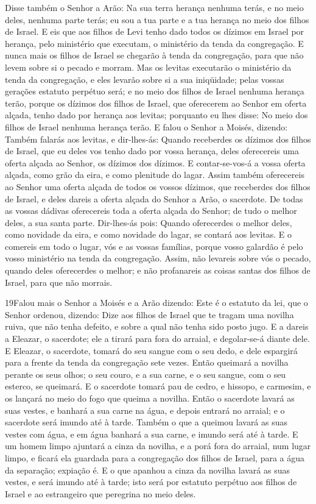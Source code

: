 Disse também o Senhor a Arão: Na sua terra herança nenhuma terás,
e no meio deles, nenhuma parte terás; eu sou a tua parte e a tua
herança no meio dos filhos de Israel. E eis que aos filhos de
Levi tenho dado todos os dízimos em Israel por herança, pelo
ministério que executam, o ministério da tenda da congregação.
E nunca mais os filhos de Israel se chegarão à tenda da
congregação, para que não levem sobre si o pecado e morram.
Mas os levitas executarão o ministério da tenda da
congregação, e eles levarão sobre si a sua iniqüidade; pelas vossas
gerações estatuto perpétuo será; e no meio dos filhos de Israel
nenhuma herança terão, porque os dízimos dos filhos de
Israel, que oferecerem ao Senhor em oferta alçada, tenho dado por
herança aos levitas; porquanto eu lhes disse: No meio dos filhos de
Israel nenhuma herança terão. E falou o Senhor a Moisés,
dizendo: Também falarás aos levitas, e dir-lhes-ás: Quando
receberdes os dízimos dos filhos de Israel, que eu deles vos tenho
dado por vossa herança, deles oferecereis uma oferta alçada ao
Senhor, os dízimos dos dízimos. E contar-se-vos-á a vossa
oferta alçada, como grão da eira, e como plenitude do lagar.
Assim também oferecereis ao Senhor uma oferta alçada de todos
os vossos dízimos, que receberdes dos filhos de Israel, e deles
dareis a oferta alçada do Senhor a Arão, o sacerdote. De
todas as vossas dádivas oferecereis toda a oferta alçada do Senhor;
de tudo o melhor deles, a sua santa parte. Dir-lhes-ás pois:
Quando oferecerdes o melhor deles, como novidade da eira, e como
novidade do lagar, se contará aos levitas. E o comereis em
todo o lugar, vós e as vossas famílias, porque vosso galardão é pelo
vosso ministério na tenda da congregação. Assim, não levareis
sobre vós o pecado, quando deles oferecerdes o melhor; e não
profanareis as coisas santas dos filhos de Israel, para que não
morrais.

\medskip

\lettrine{19} Falou mais o Senhor a Moisés e a Arão dizendo:
Este é o estatuto da lei, que o Senhor ordenou, dizendo: Dize
aos filhos de Israel que te tragam uma novilha ruiva, que não tenha
defeito, e sobre a qual não tenha sido posto jugo. E a dareis a
Eleazar, o sacerdote; ele a tirará para fora do arraial, e
degolar-se-á diante dele. E Eleazar, o sacerdote, tomará do seu
sangue com o seu dedo, e dele espargirá para a frente da tenda da
congregação sete vezes. Então queimará a novilha perante os seus
olhos; o seu couro, e a sua carne, e o seu sangue, com o seu
esterco, se queimará. E o sacerdote tomará pau de cedro, e
hissopo, e carmesim, e os lançará no meio do fogo que queima a
novilha. Então o sacerdote lavará as suas vestes, e banhará a
sua carne na água, e depois entrará no arraial; e o sacerdote será
imundo até à tarde. Também o que a queimou lavará as suas vestes
com água, e em água banhará a sua carne, e imundo será até à tarde.
E um homem limpo ajuntará a cinza da novilha, e a porá fora do
arraial, num lugar limpo, e ficará ela guardada para a congregação
dos filhos de Israel, para a água da separação; expiação é. E
o que apanhou a cinza da novilha lavará as suas vestes, e será
imundo até à tarde; isto será por estatuto perpétuo aos filhos de
Israel e ao estrangeiro que peregrina no meio deles.

